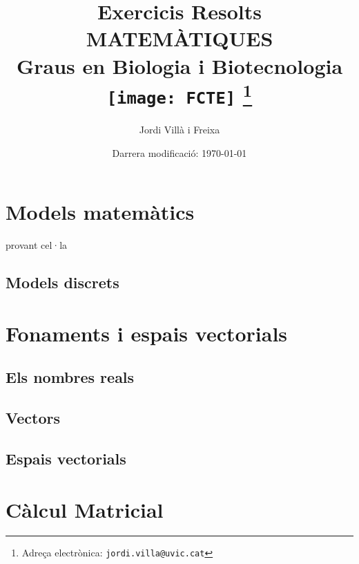 \documentclass[12pt]{book}
\begin{document}


\title{Exercicis Resolts \\ \large MATEMÀTIQUES \\ Graus en Biologia i Biotecnologia \\[15pt] \texttt{[image: FCTE]}
\thanks{Adreça electrònica: \texttt{jordi.villa@uvic.cat}}}
\author{Jordi Villà i Freixa}
\date{Darrera modificació: \today}
\maketitle
\tableofcontents
\newpage



\begin{ExerciseList}
    \section{Models matemàtics}
    provant cel·la
    \subsection{Models discrets}
    
\section{Fonaments i espais vectorials}
\subsection{Els nombres reals}

\subsection{Vectors}







\subsection{Espais vectorials}






\section{Càlcul Matricial}

\end{ExerciseList}
\end{document}
